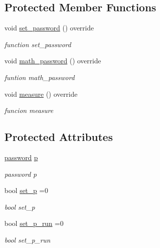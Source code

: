 \subsection*{Protected Member Functions}
\begin{DoxyCompactItemize}
\item 
void \hyperlink{classprofile_aa46b5ea874a915a76a54c4ce7fa9701c}{set\+\_\+password} () override
\begin{DoxyCompactList}\small\item\em function set\+\_\+password \end{DoxyCompactList}\item 
void \hyperlink{classprofile_a85a7931430f0cc2abc94253548b9cb37}{math\+\_\+password} () override
\begin{DoxyCompactList}\small\item\em funtion math\+\_\+password \end{DoxyCompactList}\item 
void \hyperlink{classprofile_a5cd64e12649b049cfee501c2e976bd96}{measure} () override
\begin{DoxyCompactList}\small\item\em funcion measure \end{DoxyCompactList}\end{DoxyCompactItemize}
\subsection*{Protected Attributes}
\begin{DoxyCompactItemize}
\item 
\hyperlink{classpassword}{password} \hyperlink{classprofile_afbf1e7946aa806c96044b94349a4bdad}{p}
\begin{DoxyCompactList}\small\item\em password p \end{DoxyCompactList}\item 
bool \hyperlink{classprofile_a82b3f6d034c00c6e180a3df4c46ce0f8}{set\+\_\+p} =0
\begin{DoxyCompactList}\small\item\em bool set\+\_\+p \end{DoxyCompactList}\item 
bool \hyperlink{classprofile_a0a35d68e263091faa4f4855f27ef3f38}{set\+\_\+p\+\_\+run} =0
\begin{DoxyCompactList}\small\item\em bool set\+\_\+p\+\_\+run \end{DoxyCompactList}\end{DoxyCompactItemize}


